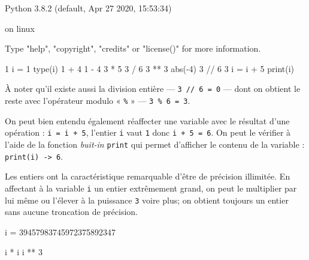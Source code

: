 \begin{idleshell*}[before skip=4pt, after skip=4pt]
Python 3.8.2 (default, Apr 27 2020, 15:53:34)\par
[GCC 9.3.0] on linux\par
Type "help", "copyright", "credits" or "license()" for more information.
\begin{pyconsole}
1
i = 1
type(i)
1 + 4
1 - 4
3 * 5
3 / 6
3 ** 3
abs(-4)
3 // 6
3 %
i = i + 5
print(i)
\end{pyconsole}
\end{idleshell*}

\vspace{4pt}

À noter qu'il existe aussi la division entière  --- \texttt{3 // 6 = 0} --- dont on obtient le reste avec l'opérateur modulo « \texttt{\%} » --- \texttt{3 \% 6 = 3}.

On peut bien entendu également réaffecter une variable avec le résultat d'une opération : \texttt{i = i + 5}, l'entier \texttt{i} vaut \texttt{1} donc \texttt{i + 5 = 6}. On peut le vérifier à l'aide de la fonction \textit{buit-in} \texttt{print} qui permet d'afficher le contenu de la variable : \texttt{print(i) -> 6}.




Les entiers ont la caractéristique remarquable d'être de précision illimitée. En affectant à la variable \texttt{i} un entier extrêmement grand, on peut le multiplier par lui même ou l’élever à la puissance \texttt{3} voire plus; on obtient toujours un entier sans aucune troncation de précision.

\begin{idleconsole}
	\begin{pyconsole}
		i = 39457983745972375892347
	\end{pyconsole}
\end{idleconsole}

\begin{idleconsole}
	\begin{pyconsole}
		i * i
		i ** 3
	\end{pyconsole}
\end{idleconsole}


